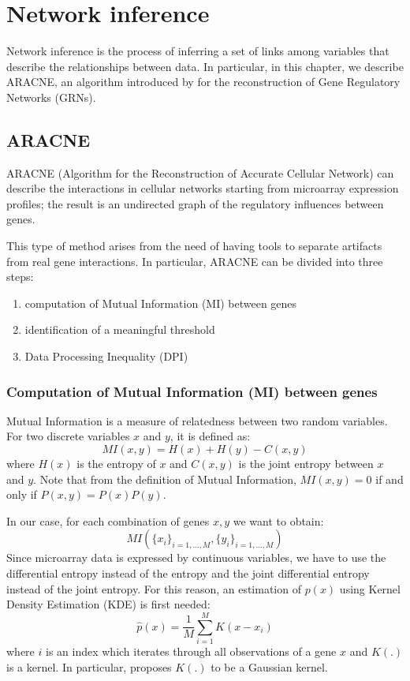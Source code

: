 \chapter{Network inference}

Network inference is the process of inferring a set of links among variables
that describe the relationships between data.
In particular, in this chapter, we describe ARACNE, an algorithm introduced by \cite{DBLP:journals/bmcbi/MargolinNBWSFC06}
for the reconstruction of Gene Regulatory Networks (GRNs).

\section{ARACNE}
ARACNE (Algorithm for the Reconstruction of Accurate Cellular Network)
can describe the interactions in cellular networks
starting from microarray expression profiles;
the result is an undirected graph of the regulatory influences between genes.

This type of method arises from the need of having tools to separate artifacts
from real gene interactions.
In particular, ARACNE can be divided into three steps:
\begin{enumerate}
    \item computation of Mutual Information (MI) between genes
    \item identification of a meaningful threshold
    \item Data Processing Inequality (DPI)
\end{enumerate}

\subsection{Computation of Mutual Information (MI) between genes} \label{MI}
Mutual Information is a measure of relatedness between two random variables.
For two discrete variables $x$ and $y$, it is defined as:
\[ \mathit{MI}(x, y) = H(x) + H(y) - C(x, y) \]
where $H(x)$ is the entropy of $x$ and $C(x, y)$ is the joint entropy between $x$ and $y$.
Note that from the definition of Mutual Information,
$\mathit{MI}(x, y) = 0$
if and only if $P(x, y) = P(x) P(y)$.

In our case, for each combination of genes $x, y$ we want to obtain:
\[ \mathit{MI}(\{ x_i \}_{i=1,\dots,M}, \{ y_i \}_{i=1,\dots,M}) \]
Since microarray data is expressed by continuous variables,
we have to use the differential entropy instead of the entropy
and the joint differential entropy instead of the joint entropy.
For this reason, an estimation of $p(x)$
using Kernel Density Estimation (KDE) is first needed:
\[ \hat{p}(x) = \frac{1}{M} \sum_{i=1}^{M} K(x - x_i) \]
where $i$ is an index which iterates through all observations of a gene $x$
and $K(.)$ is a kernel.
In particular, \cite{DBLP:journals/bmcbi/MargolinNBWSFC06} proposes
$K(.)$ to be a Gaussian kernel.

